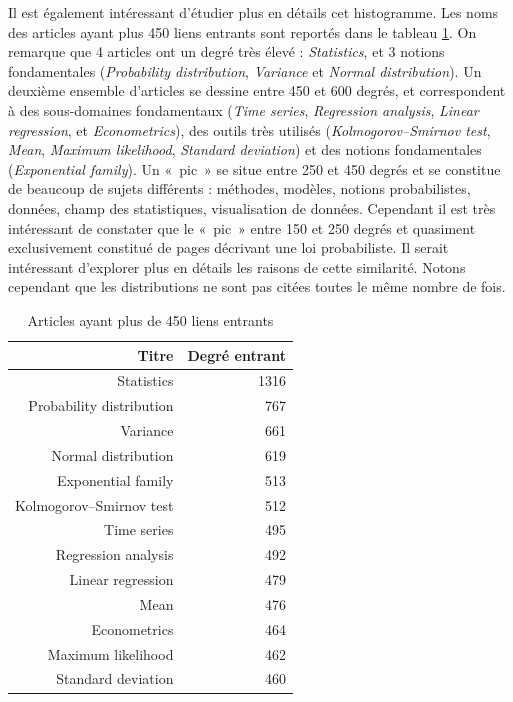 \documentclass[a4paper]{article}
\begin{document}
Il est également intéressant d'étudier plus en détails cet histogramme. Les noms des articles ayant plus 450 liens entrants sont reportés dans le tableau \ref{tab-deg-in}. On remarque que 4 articles ont un degré très élevé : \textit{Statistics}, et 3 notions fondamentales (\textit{Probability distribution}, \textit{Variance} et \textit{Normal distribution}). Un deuxième ensemble d'articles se dessine entre 450 et 600 degrés, et correspondent à des sous-domaines fondamentaux (\textit{Time series}, \textit{Regression analysis}, \textit{Linear regression}, et \textit{Econometrics}), des outils très utilisés (\textit{Kolmogorov–Smirnov test}, \textit{Mean}, \textit{Maximum likelihood}, \textit{Standard deviation}) et des notions fondamentales (\textit{Exponential family}). Un «~pic~» se situe entre 250 et 450 degrés et se constitue de beaucoup de sujets différents : méthodes, modèles, notions probabilistes, données, champ des statistiques, visualisation de données. Cependant il est très intéressant de constater que le «~pic~» entre 150 et 250 degrés et quasiment exclusivement constitué de pages décrivant une loi probabiliste. Il serait intéressant d'explorer plus en détails les raisons de cette similarité. Notons cependant que les distributions ne sont pas citées toutes le même nombre de fois.

\begin{table}[ht]
\centering
\caption{\label{tab-deg-in} Articles ayant plus de 450 liens entrants}
\begin{tabular}{rr}
  \hline
 Titre & Degré entrant \\ 
  \hline
Statistics & 1316 \\ 
  Probability distribution & 767 \\ 
  Variance & 661 \\ 
  Normal distribution & 619 \\ 
  Exponential family & 513 \\ 
  Kolmogorov–Smirnov test & 512 \\ 
  Time series & 495 \\ 
  Regression analysis & 492 \\ 
  Linear regression & 479 \\ 
  Mean & 476 \\ 
  Econometrics & 464 \\ 
  Maximum likelihood & 462 \\ 
  Standard deviation & 460 \\ 
   \hline
\end{tabular}
\end{table}
\end{document}
